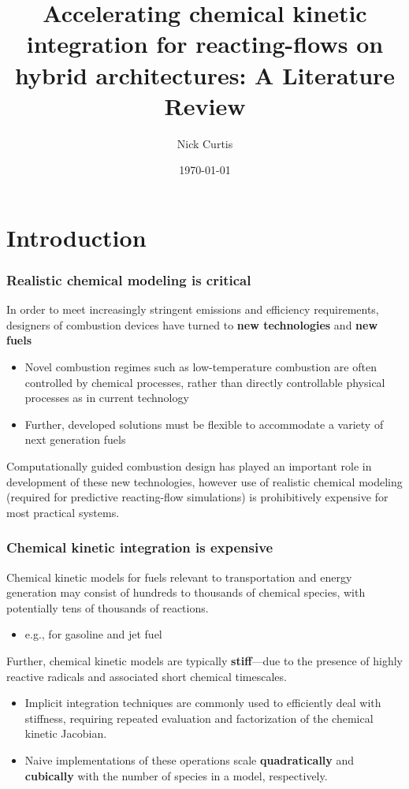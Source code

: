 \documentclass{beamer}
\title{Accelerating chemical kinetic integration for reacting-flows on hybrid architectures: A Literature Review}
\author{Nick Curtis}
\institute{University of Connecticut}
\date{\today}
\newcounter{expensive}
\newcounter{stiff}
\begin{document}
\maketitle

\section{Introduction}

\begin{frame}
\frametitle{Realistic chemical modeling is \textbf{critical}}
In order to meet increasingly stringent emissions and efficiency requirements, designers of combustion devices have turned to \textbf{new technologies} and \textbf{new fuels}
\begin{itemize}
 \item Novel combustion regimes such as low-temperature combustion are often controlled by chemical processes, rather than directly controllable physical processes as in current technology
 \item Further, developed solutions must be flexible to accommodate a variety of next generation fuels
\end{itemize}
Computationally guided combustion design has played an important role in development of these new technologies, however use of realistic chemical modeling (required for predictive reacting-flow simulations) is prohibitively expensive for most practical systems. 
\end{frame}

\begin{frame}
 \frametitle{Chemical kinetic integration is \textbf{expensive}}
 Chemical kinetic models for fuels relevant to transportation and energy generation may consist of hundreds to thousands of chemical species, with potentially tens of thousands of reactions.
 \begin{itemize}
  \item e.g., for gasoline  and jet fuel
 \end{itemize}
 Further, chemical kinetic models are typically \textbf{stiff}---due to the presence of highly reactive radicals and associated short chemical timescales.
 \begin{itemize}
  \item Implicit integration techniques are commonly used to efficiently deal with stiffness, requiring repeated evaluation and factorization of the chemical kinetic Jacobian.
  \item Naive implementations of these operations scale \textbf{quadratically} and \textbf{cubically} with the number of species in a model, respectively.
 \end{itemize}
\end{frame}
\end{document}
